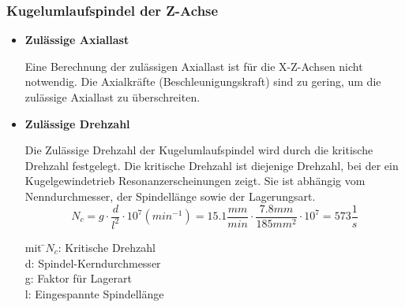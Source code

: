 \subsubsection{Kugelumlaufspindel der Z-Achse}


\begin{itemize}

\item \textbf{Zulässige Axiallast}
 
Eine Berechnung der zulässigen Axiallast ist für die X-Z-Achsen nicht notwendig. Die Axialkräfte (Beschleunigungskraft) sind zu gering, um die zulässige Axiallast zu überschreiten. 




	 		





\item \textbf{Zulässige Drehzahl}

Die Zulässige Drehzahl der Kugelumlaufspindel wird durch die kritische Drehzahl festgelegt. Die kritische Drehzahl ist diejenige Drehzahl, bei der ein Kugelgewindetrieb Resonanzerscheinungen zeigt. Sie ist abhängig vom Nenndurchmesser, der Spindellänge sowie der Lagerungsart.\\

\[N_c=g\cdot\dfrac{d}{l^2}\cdot 10^7 (min^{-1}) = 15.1\dfrac{mm}{min} \cdot \dfrac{7.8mm}{185mm^2}\cdot 10^7 = 573 \dfrac{1}{s}\]


\begin{tabbing}
mit \=$N_c$: Kritische Drehzahl\\
		\>d: Spindel-Kerndurchmesser\\
		\>g: Faktor für Lagerart\\
		\>l: Eingespannte Spindellänge\\
		

\end{tabbing}
\end{itemize}
